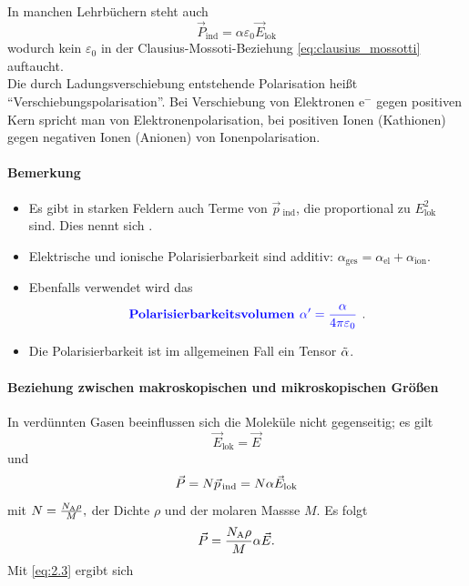     In manchen Lehrbüchern steht auch
    $$
    \vec{P}_{\text{ind}} = \alpha \varepsilon_0 \vec{E}_{\text{lok}}
    $$ 
    wodurch kein $ \varepsilon_0$ in der Clausius-Mossoti-Beziehung \eqref{eq:clausius_mossotti} auftaucht.\\
    
    Die durch Ladungsverschiebung entstehende Polarisation heißt \enquote{Verschiebungspolarisation}. Bei Verschiebung von Elektronen $\mathrm{e}^{-}$ gegen positiven Kern spricht man von Elektronenpolarisation, bei positiven Ionen (Kathionen) gegen negativen Ionen (Anionen) von Ionenpolarisation.

\paragraph{Bemerkung}
    \begin{itemize}
    	\item Es gibt in starken Feldern auch Terme von $\vec{p}\,_{\text{ind}}$, die proportional zu $E^2_{\text{lok}}$ sind. Dies nennt sich .
    	\item Elektrische und ionische Polarisierbarkeit sind additiv: $\alpha_\text{ges} = \alpha_{\text{el}} + \alpha_{\text{ion}}$. 
    	\item Ebenfalls verwendet wird das $$\textbf{\textcolor{blue}{Polarisierbarkeitsvolumen $\alpha'= \frac{ \alpha}{4 \pi \varepsilon_0}$ }}.$$
    	\item Die Polarisierbarkeit ist im allgemeinen Fall ein Tensor $\tilde{ \alpha}$.
    \end{itemize}

\paragraph{Beziehung zwischen makroskopischen und mikroskopischen Größen}
    In verdünnten Gasen beeinflussen sich die Moleküle nicht gegenseitig; es gilt
    $$
    \vec{E}_{\text{lok}} = \vec{E}
    $$
    und
    \begin{equation}
    	\label{2.8}
    	\vec{P} = N \vec{p}_{\text{\,ind}} = N \alpha \vec{E}_{\text{lok}}
    \end{equation}
    mit
    $
    N = \frac{N_\mathrm{A} \rho}{M},
    $
    der Dichte $\rho$ und der molaren Massse $M$. Es folgt
    \begin{equation}
    	\vec{P} = \frac{N_\mathrm{A} \rho}{M} \alpha \vec{E}.
        \label{eq:2.10}
    \end{equation}
    Mit \ref{eq:2.3} ergibt sich
    
